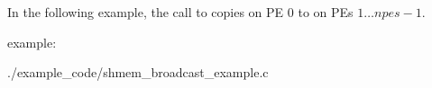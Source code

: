 \begin{apidefinition}
\begin{apiexamples}

\apicexample
    {In the following example, the call to  copies \source{}
    on \ac{PE} $0$ to \dest{} on \acp{PE} $1\dots npes-1$.
    
    \CorCpp{} example:}
    {./example_code/shmem_broadcast_example.c}
    {}

\end{apiexamples}

\end{apidefinition}
